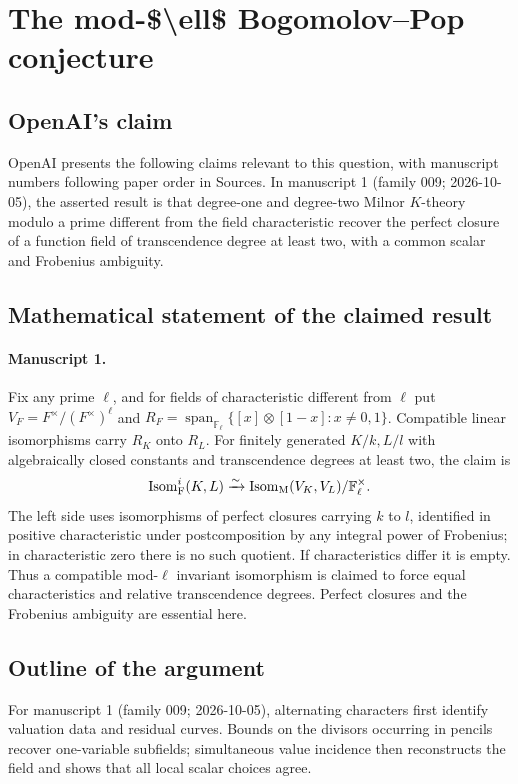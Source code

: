 \documentclass[11pt]{article}
\begin{document}
\section*{The mod-\$\textbackslash{}ell\$ Bogomolov–Pop conjecture}

\subsection{OpenAI's claim}
OpenAI presents the following claims relevant to this question, with manuscript numbers following paper order in Sources. In manuscript 1 (family 009; 2026-10-05), the asserted result is that degree-one and degree-two Milnor $K$-theory modulo a prime different from the field characteristic recover the perfect closure of a function field of transcendence degree at least two, with a common scalar and Frobenius ambiguity.

\subsection{Mathematical statement of the claimed result}
\paragraph{Manuscript 1.}
Fix any prime $\ell$, and for fields of characteristic different from $\ell$ put $V_F=F^{\times}/(F^{\times})^{\ell}$ and $R_F=\operatorname{span}_{\mathbb F_{\ell}}\{[x]\otimes[1-x]:x\ne0,1\}$. Compatible linear isomorphisms carry $R_K$ onto $R_L$. For finitely generated $K/k,L/l$ with algebraically closed constants and transcendence degrees at least two, the claim is
\[
 \operatorname{Isom}_{\rm F}^{i}(K,L)\xrightarrow{\sim}
 \operatorname{Isom}_{\rm M}(V_K,V_L)/\mathbb F_{\ell}^{\times}.
\]
The left side uses isomorphisms of perfect closures carrying $k$ to $l$, identified in positive characteristic under postcomposition by any integral power of Frobenius; in characteristic zero there is no such quotient. If characteristics differ it is empty. Thus a compatible mod-$\ell$ invariant isomorphism is claimed to force equal characteristics and relative transcendence degrees. Perfect closures and the Frobenius ambiguity are essential here.

\subsection{Outline of the argument}
For manuscript 1 (family 009; 2026-10-05), alternating characters first identify valuation data and residual curves. Bounds on the divisors occurring in pencils recover one-variable subfields; simultaneous value incidence then reconstructs the field and shows that all local scalar choices agree.
\end{document}
